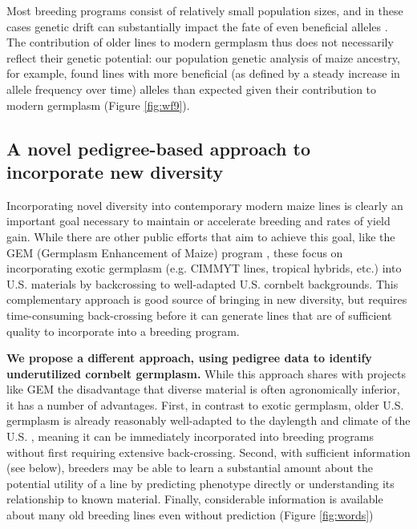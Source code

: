 \documentclass[12pt]{article}
\begin{document}
Most breeding programs consist of relatively small population sizes, and in these cases genetic drift can substantially impact the fate of even beneficial alleles \citep[e.g.][]{Gerke:2013tw}.
The contribution of older lines to modern germplasm thus does not necessarily reflect their genetic potential: our population genetic analysis of maize ancestry, for example, found lines with more beneficial (as defined by a steady increase in allele frequency over time) alleles than expected given their contribution to modern germplasm (Figure \ref{fig:wf9}).

\subsection*{A novel pedigree-based approach to incorporate new diversity}

Incorporating novel diversity into contemporary modern maize lines is clearly an important goal necessary to maintain or accelerate breeding and rates of yield gain.
While there are other public efforts that aim to achieve this goal, like the GEM  (Germplasm Enhancement of Maize) program \citep{pollak2003history}, these  focus on incorporating exotic germplasm (e.g. CIMMYT lines, tropical hybrids, etc.) into U.S. materials by backcrossing to well-adapted U.S. cornbelt backgrounds.
This complementary approach is good source of bringing in new diversity, but requires time-consuming back-crossing before it can generate lines that are of sufficient quality to incorporate into a breeding program.

\textbf{We propose a different approach, using pedigree data to identify underutilized cornbelt germplasm.}  
While this approach shares with projects like GEM the disadvantage that diverse material is often  agronomically inferior, it has a number of advantages.  
First, in contrast to exotic germplasm, older U.S. germplasm is already reasonably well-adapted to the daylength and climate of the U.S. \citep{Teixeira:2014hr}, meaning it can be immediately incorporated into breeding programs without first requiring extensive back-crossing.
Second, with sufficient information (see below), breeders may be able to learn a substantial amount about the potential utility of a line by predicting phenotype directly or understanding its relationship to known material. 
Finally, considerable information is available about many old breeding lines even without prediction (Figure \ref{fig:words})
\end{document}
